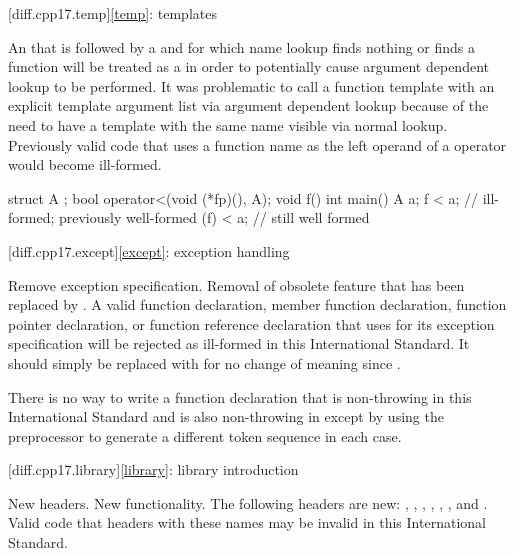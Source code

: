 [diff.cpp17.temp]{\ref{temp}: templates}

\change
An 
that is followed by a \tcode{<}
and for which name lookup
finds nothing or finds a function
will be treated as a 
in order to potentially cause argument dependent lookup to be performed.
\rationale
It was problematic to call a function template
with an explicit template argument list
via argument dependent lookup
because of the need to have a template with the same name
visible via normal lookup.
\effect
Previously valid code that uses a function name
as the left operand of a \tcode{<} operator
would become ill-formed.
\begin{codeblock}
struct A {};
bool operator<(void (*fp)(), A);
void f() {}
int main() {
  A a;
  f < a;    // ill-formed; previously well-formed
  (f) < a;  // still well formed
}
\end{codeblock}

[diff.cpp17.except]{\ref{except}: exception handling}

\change Remove  exception specification.
\rationale
Removal of obsolete feature that has been replaced by .
\effect
A valid \CppXVII{} function declaration, member function declaration, function
pointer declaration, or function reference declaration that uses 
for its exception specification will be rejected as ill-formed in this
International Standard. It should simply be replaced with  for no
change of meaning since \CppXVII{}.
\begin{note}
There is no way to write a function declaration
that is non-throwing in this International Standard
and is also non-throwing in \CppIII{}
except by using the preprocessor to generate
a different token sequence in each case.
\end{note}

[diff.cpp17.library]{\ref{library}: library introduction}

\change New headers.
\rationale New functionality.
\effect
The following \Cpp{} headers are new:
,
,
,
,
,
, and
.
Valid \CppXVII{} code that  headers with these names may be
invalid in this International Standard.

